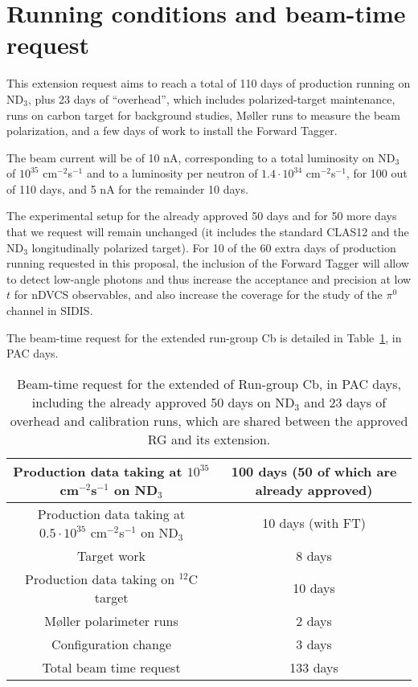 \section{Running conditions and beam-time request}
This extension request aims to reach a total of 110 days of production running on ND$_3$, plus 23 days of ``overhead'', which includes polarized-target maintenance, runs on carbon target for background studies, M\o ller runs to measure the beam polarization, and a few days of work to install the Forward Tagger. 

The beam current will be of 10 nA, corresponding to a total luminosity on ND$_3$ of $10^{35}$ cm$^{-2}$s$^{-1}$ and to a luminosity per neutron of $1.4 \cdot 10^{34}$ cm$^{-2}$s$^{-1}$, for 100 out of 110 days, and 5 nA for the remainder 10 days. 

The experimental setup for the already approved 50 days and for 50 more days that we request will remain unchanged (it includes the standard CLAS12 and the ND$_3$ longitudinally polarized target). For 10 of the 60 extra days of production running requested in this proposal, the inclusion of the Forward Tagger will allow to detect low-angle photons and thus increase the acceptance and precision at low $t$ for nDVCS observables, and also increase the coverage for the study of the $\pi^0$ channel in SIDIS. 

The beam-time request for the extended run-group Cb is detailed in Table~\ref{beam_time_summary}, in PAC days. 

\begin{table}
\begin{center}
\begin{tabular}{|c||c|}
\hline
Production data taking at $10^{35}$ cm$^{-2}$s$^{-1}$ on ND$_3$ & 100 days (50 of which are already approved)\\
\hline
Production data taking at $0.5\cdot 10^{35}$ cm$^{-2}$s$^{-1}$ on ND$_3$ & 10 days (with FT)\\
\hline
Target work & 8 days\\
\hline
Production data taking on $^{12}$C target & 10 days\\
\hline 
M\o ller polarimeter runs & 2 days\\
\hline
Configuration change & 3 days \\
\hline
\hline
Total beam time request & 133 days\\
\hline
\end{tabular}
\caption{Beam-time request for the extended of Run-group Cb, in PAC days, including the already approved 50 days on ND$_3$ and 23 days of overhead and calibration runs, which are shared between the approved RG and its extension.}
\label{beam_time_summary}
\end{center}
\end{table}

